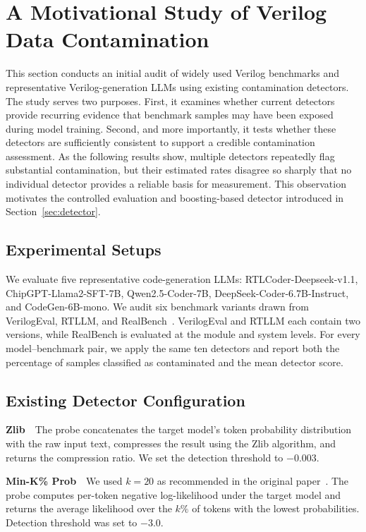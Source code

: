\section{A Motivational Study of Verilog Data Contamination}
\label{sec:detection}
\noindent This section conducts an initial audit of widely used Verilog benchmarks and representative Verilog-generation LLMs using existing contamination detectors. The study serves two purposes. First, it examines whether current detectors provide recurring evidence that benchmark samples may have been exposed during model training. Second, and more importantly, it tests whether these detectors are sufficiently consistent to support a credible contamination assessment. As the following results show, multiple detectors repeatedly flag substantial contamination, but their estimated rates disagree so sharply that no individual detector provides a reliable basis for measurement. This observation motivates the controlled evaluation and boosting-based detector introduced in Section~\ref{sec:detector}.

\subsection{Experimental Setups} \label{sec:target}
We evaluate five representative code-generation LLMs: RTLCoder-Deepseek-v1.1, ChipGPT-Llama2-SFT-7B, Qwen2.5-Coder-7B, DeepSeek-Coder-6.7B-Instruct, and CodeGen-6B-mono. We audit six benchmark variants drawn from VerilogEval, RTLLM, and RealBench~\cite{liu2023verilogeval,lu2024rtllm,jin2025realbench}. VerilogEval and RTLLM each contain two versions, while RealBench is evaluated at the module and system levels. For every model--benchmark pair, we apply the same ten detectors and report both the percentage of samples classified as contaminated and the mean detector score.

\subsection{Existing Detector Configuration} \label{sec:methods}

\textbf{Zlib}\ \ The probe concatenates the target model's token probability distribution with the raw input text, compresses the result using the Zlib algorithm, and returns the compression ratio. We set the detection threshold to $-0.003$.

\textbf{Min-K\% Prob}\ \ We used $k=20$ as recommended in the original paper~\cite{shi2024detecting}. The probe computes per-token negative log-likelihood under the target model and returns the average likelihood over the $k\%$ of tokens with the lowest probabilities. Detection threshold was set to $-3.0$.

